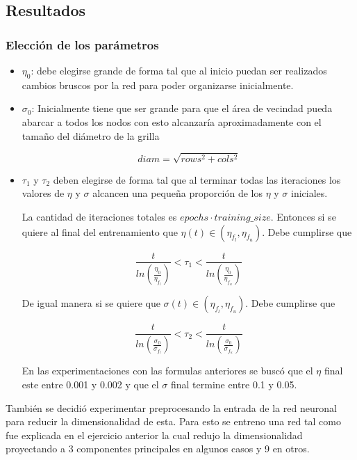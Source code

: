 \subsection{Resultados}
\subsubsection{Elección de los parámetros}
\begin{itemize}
	\item $\eta_0$: debe elegirse grande de forma tal que al inicio puedan ser
	realizados cambios bruscos por la red para poder organizarse inicialmente.

	\item $\sigma_0$: Inicialmente tiene que ser grande para que el área de
	vecindad pueda abarcar a todos los nodos con esto alcanzaría
	aproximadamente con el tamaño del diámetro de la grilla

\[
	diam = \sqrt{rows^2+cols^2}
\]
	\item $\tau_1$ y $\tau_2$ deben elegirse de forma tal que al terminar todas
	las iteraciones los valores de $\eta$ y $\sigma$ alcancen una pequeña
	proporción de los $\eta$ y $\sigma$ iniciales.

	La cantidad de iteraciones totales es $epochs \cdot training\_size $.
	Entonces si se quiere al final del entrenamiento que $\eta(t) \in (\eta_{f_l}, \eta_{f_u})$.
	Debe cumplirse que

	\[ \frac{t}{ln(\frac{\eta_0}{\eta_{f_l}})} < \tau_{1} < \frac{t}{ln(\frac{\eta_0}{\eta_{f_u}})} \]

	De igual manera si se quiere que $\sigma(t) \in (\eta_{f_l}, \eta_{f_u})$.
	Debe cumplirse que

	\[ \frac{t}{ln(\frac{\sigma_0}{\sigma_{f_l}})} < \tau_{2} < \frac{t}{ln(\frac{\sigma_0}{\sigma_{f_u}})} \]

	En las experimentaciones con las formulas anteriores se buscó que el $\eta$
	final este entre 0.001 y 0.002 y que el $\sigma$ final termine entre 0.1 y
	0.05.

\end{itemize}

También se decidió experimentar preprocesando la entrada de la red neuronal
para reducir la dimensionalidad de esta.  Para esto se entreno una red tal como
fue explicada en el ejercicio anterior la cual redujo la dimensionalidad
proyectando a 3 componentes principales en algunos casos y 9 en otros.

